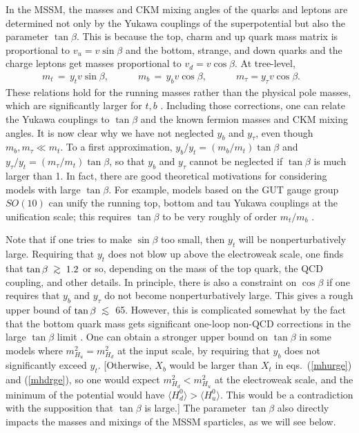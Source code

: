 \documentclass[12pt]{article}
\def\beq{\begin{eqnarray}}
\def\eeq{\end{eqnarray}}
\def\centeron#1#2{{\setbox0=\hbox{#1}\setbox1=\hbox{#2}\ifdim
\wd1>\wd0\kern.5\wd1\kern-.5\wd0\fi
\copy0\kern-.5\wd0\kern-.5\wd1\copy1\ifdim\wd0>\wd1
\kern.5\wd0\kern-.5\wd1\fi}}
\def\ltap{\;\centeron{\raise.35ex\hbox{$<$}}{\lower.65ex\hbox{$\sim$}}\;}
\def\gtap{\;\centeron{\raise.35ex\hbox{$>$}}{\lower.65ex\hbox{$\sim$}}\;}
\def\gsim{\mathrel{\gtap}}
\def\lsim{\mathrel{\ltap}}
\begin{document}
In the MSSM, the masses and CKM mixing angles of the quarks and leptons 
are determined not only by the Yukawa couplings of the superpotential but 
also the parameter $\tan\beta$. This is because the top, charm and up 
quark mass matrix is proportional to $v_u = v \sin\beta$ and the bottom, 
strange, and down quarks and the charge leptons get masses proportional to 
$v_d = v \cos\beta$. At tree-level,
\beq
m_t \,=\, y_t v \sin\beta
,
\qquad\quad
m_b \,=\, y_b v \cos\beta
,
\qquad\quad
m_\tau = y_\tau v \cos\beta .\phantom{xxx}
\label{eq:ytbtaumtbtau}
\eeq
These relations hold for the running masses rather than the physical pole 
masses, which are significantly larger for $t,b$ \cite{polecat}. Including 
those corrections, one can relate the Yukawa couplings to $\tan\beta$ and 
the known fermion masses and CKM mixing angles. It is now clear why we 
have not neglected $y_b$ and $y_\tau$, even though $m_b,m_\tau\ll m_t$. To 
a first approximation, $y_b/y_t = (m_b/m_t)\tan\beta$ and $y_\tau/y_t = 
(m_\tau/m_t)\tan\beta$, so that $y_b$ and $y_\tau$ cannot be neglected if 
$\tan\beta$ is much larger than 1. In fact, there are good theoretical 
motivations for considering models with large $\tan\beta$. For example, 
models based on the GUT gauge group $SO(10)$ 
can unify the running top, bottom and tau Yukawa couplings at the 
unification scale; this requires $\tan\beta$ to be very roughly of order 
$m_t/m_b$ \cite{so10,copw}.

Note that if one tries to make $\sin\beta$ too small, then $y_t$ will be 
nonperturbatively large. Requiring that $y_t$ does not blow up above the 
electroweak scale, one finds that $\tan\beta \gsim 1.2$ or so, depending 
on the mass of the top quark, the QCD coupling, and other details. In 
principle, there is also a constraint on $\cos\beta$ if one requires 
that $y_b$ and $y_\tau$ do not become nonperturbatively large. This 
gives a rough upper bound of $\tan\beta \lsim$ 65. However, this is 
complicated somewhat by the fact that the bottom quark mass gets 
significant one-loop non-QCD corrections in the large $\tan\beta$ limit 
\cite{copw}. One can obtain a stronger upper bound on $\tan\beta$ in some 
models where $m_{H_u}^2 = m_{H_d}^2$ at the input scale, by requiring that 
$y_b$ does not significantly exceed $y_t$. [Otherwise, $X_b$ would be 
larger than $X_t$ in eqs.~(\ref{mhurge}) and (\ref{mhdrge}), so one would 
expect $m_{H_d}^2 < m_{H_u}^2$ at the electroweak scale, and the minimum 
of the potential would have $\langle H_d^0 \rangle > \langle H_u^0 
\rangle$. This would be a contradiction with the supposition that 
$\tan\beta$ is large.] The parameter $\tan\beta$ also 
directly impacts the masses and mixings of the MSSM sparticles,
as we will see below.
\end{document}
